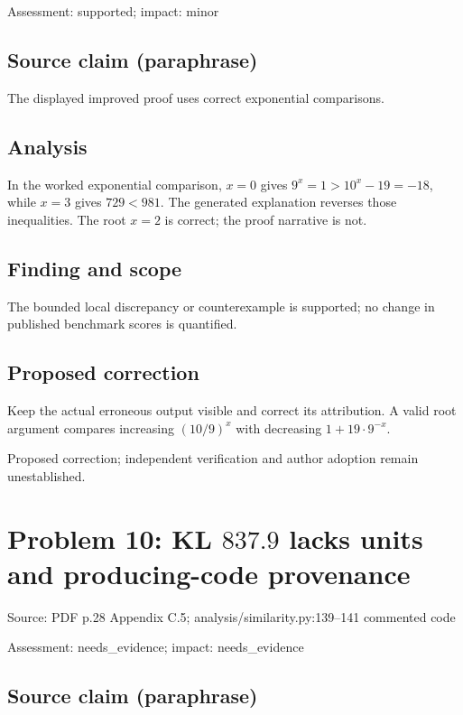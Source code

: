 \documentclass[11pt]{article}
\begin{document}
Assessment: supported; impact: minor

\subsection*{Source claim (paraphrase)}

The displayed improved proof uses correct exponential comparisons.

\subsection*{Analysis}

In the worked exponential comparison, \(x=0\) gives \(9^x=1>10^x-19=-18\), while \(x=3\) gives \(729<981\). The generated explanation reverses those inequalities. The root \(x=2\) is correct; the proof narrative is not.

\subsection*{Finding and scope}

The bounded local discrepancy or counterexample is supported; no change in published benchmark scores is quantified.

\subsection*{Proposed correction}

Keep the actual erroneous output visible and correct its attribution. A valid root argument compares increasing \((10/9)^x\) with decreasing \(1+19\cdot9^{-x}\).

Proposed correction; independent verification and author adoption remain unestablished.

\section*{Problem 10: KL \(837.9\) lacks units and producing-code provenance}

Source: PDF p.28 Appendix C.5; analysis/similarity.py:139–141 commented code

Assessment: needs\_evidence; impact: needs\_evidence

\subsection*{Source claim (paraphrase)}
\end{document}
